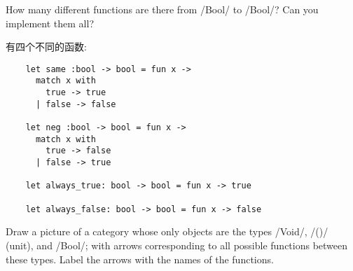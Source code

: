 \documentclass[lang=cn]{elegantbook}
\begin{document}
\begin{exercise}
How many different functions are there from \ocamlinline/Bool/ to \ocamlinline/Bool/? Can you implement them all?
\end{exercise}

\begin{solution}

有四个不同的函数:

\begin{verbatim}
    let same :bool -> bool = fun x ->
      match x with
        true -> true
      | false -> false
    
    let neg :bool -> bool = fun x ->
      match x with
        true -> false
      | false -> true
    
    let always_true: bool -> bool = fun x -> true
    
    let always_false: bool -> bool = fun x -> false

\end{verbatim}

\end{solution}

\begin{exercise}
Draw a picture of a category whose only objects are the types \ocamlinline/Void/, \ocamlinline/()/ (unit), and \ocamlinline/Bool/; with arrows corresponding to all possible functions between these types. Label the arrows with the names of the functions.
\end{exercise}
\end{document}
